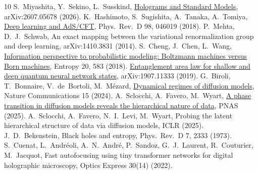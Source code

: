 \documentclass[10pt,twocolumn,a4paper]{article}
\begin{document}
\small
\begin{thebibliography}{10}\setlength{\itemsep}{1pt}
 S.~Miyashita, Y.~Sekino, L.~Susskind, \href{https://arxiv.org/abs/2607.05678}{Holograms and Standard Models}, arXiv:2607.05678 (2026).
 K.~Hashimoto, S.~Sugishita, A.~Tanaka, A.~Tomiya, \href{https://arxiv.org/abs/1802.08313}{Deep learning and AdS/CFT}, Phys.\ Rev.\ D 98, 046019 (2018).
 P.~Mehta, D.~J.~Schwab, An exact mapping between the variational renormalization group and deep learning, arXiv:1410.3831 (2014).
 S.~Cheng, J.~Chen, L.~Wang, \href{https://arxiv.org/abs/1712.04144}{Information perspective to probabilistic modeling: Boltzmann machines versus Born machines}, Entropy 20, 583 (2018).
 \href{https://arxiv.org/abs/1907.11333}{Entanglement area law for shallow and deep quantum neural network states}, arXiv:1907.11333 (2019).
 G.~Biroli, T.~Bonnaire, V.~de~Bortoli, M.~M\'ezard, \href{https://arxiv.org/abs/2402.18491}{Dynamical regimes of diffusion models}, Nature Communications 15 (2024).
 A.~Sclocchi, A.~Favero, M.~Wyart, \href{https://arxiv.org/abs/2402.16991}{A phase transition in diffusion models reveals the hierarchical nature of data}, PNAS (2025).
 A.~Sclocchi, A.~Favero, N.~I.~Levi, M.~Wyart, Probing the latent hierarchical structure of data via diffusion models, ICLR (2025).
 J.~D.~Bekenstein, Black holes and entropy, Phys.\ Rev.\ D 7, 2333 (1973).
 S.~Cuenat, L.~Andr\'eoli, A.~N.~Andr\'e, P.~Sandoz, G.~J.~Laurent, R.~Couturier, M.~Jacquot, Fast autofocusing using tiny transformer networks for digital holographic microscopy, Optics Express 30(14) (2022).
\end{thebibliography}
\end{document}
